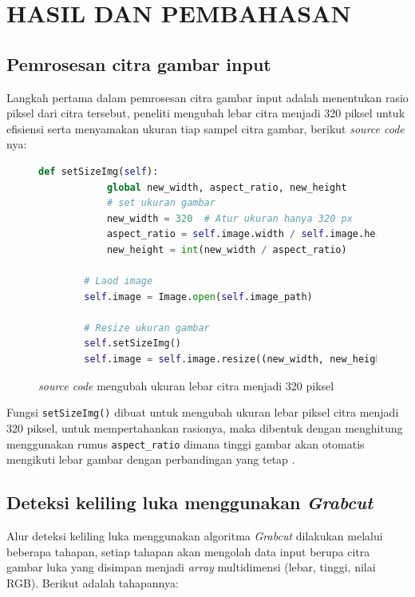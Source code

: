 
\chapter{HASIL DAN PEMBAHASAN}

\section{Pemrosesan citra gambar input}
Langkah pertama dalam pemrosesan citra gambar input adalah menentukan rasio piksel 
dari citra tersebut, peneliti mengubah lebar citra menjadi 320 piksel untuk efisiensi 
serta menyamakan ukuran tiap sampel citra gambar, berikut \emph{source code} nya:

\begin{figure}[H]
	\begin{lstlisting}[language=Python, basicstyle=\tiny]
		def setSizeImg(self):
			global new_width, aspect_ratio, new_height
			# set ukuran gambar
			new_width = 320  # Atur ukuran hanya 320 px
			aspect_ratio = self.image.width / self.image.height
			new_height = int(new_width / aspect_ratio)
		
		# Laod image
		self.image = Image.open(self.image_path)

		# Resize ukuran gambar
		self.setSizeImg() 
		self.image = self.image.resize((new_width, new_height)) 
	\end{lstlisting}
	\caption{\emph{source code} mengubah ukuran lebar citra menjadi 320 piksel}
	\label{code:resize_gambar}
\end{figure}

Fungsi \texttt{setSizeImg()} dibuat untuk mengubah ukuran lebar piksel citra 
menjadi 320 piksel, untuk mempertahankan rasionya, maka dibentuk dengan menghitung
menggunakan rumus \texttt{aspect\_ratio} dimana tinggi gambar akan otomatis mengikuti lebar gambar 
dengan perbandingan yang tetap .

\section{Deteksi keliling luka menggunakan \emph{Grabcut}}
Alur deteksi keliling luka menggunakan algoritma \emph{Grabcut} dilakukan melalui
beberapa tahapan, setiap tahapan akan mengolah data input berupa citra gambar luka 
yang disimpan menjadi \emph{array} multidimensi (lebar, tinggi, nilai RGB).
Berikut adalah tahapannya:

